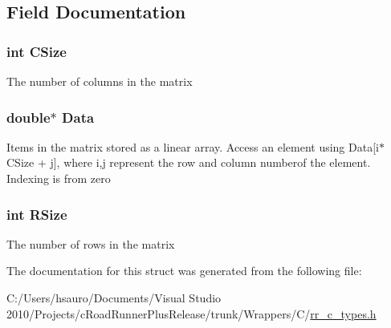 \subsection{\-Field \-Documentation}
\hypertarget{struct_r_r_matrix_a17c9a5894aa9cb3789346dcaa9c370bb}{
\subsubsection[{\-C\-Size}]{\setlength{\rightskip}{0pt plus 5cm}int {\bf \-C\-Size}}}
\label{struct_r_r_matrix_a17c9a5894aa9cb3789346dcaa9c370bb}
\-The number of columns in the matrix \hypertarget{struct_r_r_matrix_a7c5cbda3aa940f4b0d6e8a1679307dfc}{
\subsubsection[{\-Data}]{\setlength{\rightskip}{0pt plus 5cm}double$\ast$ {\bf \-Data}}}
\label{struct_r_r_matrix_a7c5cbda3aa940f4b0d6e8a1679307dfc}
\-Items in the matrix stored as a linear array. \-Access an element using \-Data\mbox{[}i$\ast$\-C\-Size + j\mbox{]}, where i,j represent the row and column numberof the element. \-Indexing is from zero \hypertarget{struct_r_r_matrix_a4d8512c879223c0e0d1522dae38e7819}{
\subsubsection[{\-R\-Size}]{\setlength{\rightskip}{0pt plus 5cm}int {\bf \-R\-Size}}}
\label{struct_r_r_matrix_a4d8512c879223c0e0d1522dae38e7819}
\-The number of rows in the matrix 

\-The documentation for this struct was generated from the following file\-:\begin{DoxyCompactItemize}
\item 
\-C\-:/\-Users/hsauro/\-Documents/\-Visual Studio 2010/\-Projects/c\-Road\-Runner\-Plus\-Release/trunk/\-Wrappers/\-C/\hyperlink{rr__c__types_8h}{rr\-\_\-c\-\_\-types.\-h}\end{DoxyCompactItemize}
